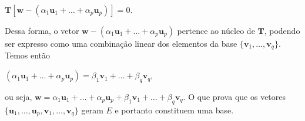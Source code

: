 \centerline{$\mathbf{T}[\mathbf{w} - (\alpha_1\mathbf{u}_1 + \ldots + \alpha_p\mathbf{u}_p)] = 0$.}

Dessa forma, o vetor $\mathbf{w} - (\alpha_1\mathbf{u}_1 + \ldots + \alpha_p\mathbf{u}_p)$ pertence ao núcleo de $\mathbf{T}$, podendo ser expresso como uma combinação linear dos elementos da base $\{\mathbf{v}_1, \ldots, \mathbf{v}_q\}$. Temos então

\centerline{$(\alpha_1\mathbf{u}_1 + \ldots + \alpha_p\mathbf{u}_p) = \beta_1\mathbf{v}_1 + \ldots + \beta_q\mathbf{v}_q$,}

ou seja, $\mathbf{w} = \alpha_1\mathbf{u}_1 + \ldots + \alpha_p\mathbf{u}_p + \beta_1\mathbf{v}_1 + \ldots + \beta_q\mathbf{v}_q$. O que prova que os vetores $\{\mathbf{u}_1, \ldots, \mathbf{u}_p, \mathbf{v}_1, \ldots, \mathbf{v}_q\}$ geram $E$ e portanto constituem uma base.
